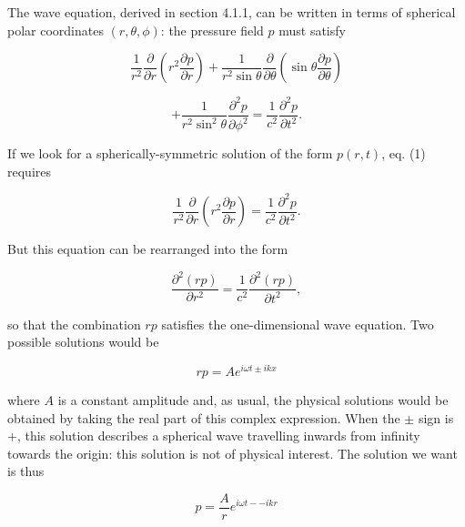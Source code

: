   The wave equation, derived in section 4.1.1, can be written in terms of 
  spherical polar coordinates $(r,\theta,\phi)$: the pressure field $p$ must 
  satisfy 

  \begin{equation*}\frac{1}{r^2} \frac{\partial}{\partial r} \left( r^2 
  \frac{\partial p}{\partial r} \right) + \frac{1}{r^2 \sin \theta} 
  \frac{\partial}{\partial \theta} \left(\sin \theta \frac{\partial p}{\partial 
  \theta} \right) \end{equation*} 

  \begin{equation*}+ \frac{1}{r^2 \sin^2 \theta} \frac{\partial^2 p}{\partial 
  \phi^2} = \frac{1}{c^2} \frac{\partial^2 p}{\partial t^2}. 
  \tag{1}\end{equation*} 

  If we look for a spherically-symmetric solution of the form $p(r,t)$, eq. (1) 
  requires 

  \begin{equation*}\frac{1}{r^2} \frac{\partial}{\partial r} \left( r^2 
  \frac{\partial p}{\partial r} \right) = \frac{1}{c^2} \frac{\partial^2 
  p}{\partial t^2}. \tag{2}\end{equation*} 

  But this equation can be rearranged into the form 

  \begin{equation*} \frac{\partial^2 (rp)}{\partial r^2} = \frac{1}{c^2} 
  \frac{\partial^2 (rp)}{\partial t^2}, \tag{3}\end{equation*} 

  \noindent{}so that the combination $rp$ satisfies the one-dimensional wave 
  equation. Two possible solutions would be 

  \begin{equation*}rp=Ae^{i \omega t \pm i k x} \tag{4}\end{equation*} 

  \noindent{}where $A$ is a constant amplitude and, as usual, the physical 
  solutions would be obtained by taking the real part of this complex 
  expression. When the $\pm$ sign is $+$, this solution describes a spherical 
  wave travelling inwards from infinity towards the origin: this solution is 
  not of physical interest. The solution we want is thus 

  \begin{equation*}p=\frac{A}{r} e^{i \omega t -- i k r} \tag{5}\end{equation*} 

